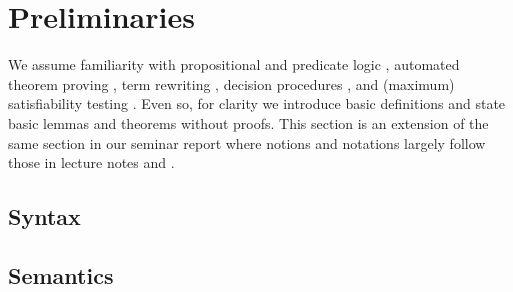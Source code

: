 
\chapter{Preliminaries}



We assume familiarity with propositional and predicate logic \cite{Huth:2004:LCS:975331}, 
automated theorem proving \cite{Fitting:1996:FLA:230183}, 
term rewriting \cite{Baader:1998:TR:280474}, 
decision procedures \cite{Kroening:2008:DPA:1391237}, 
and (maximum) satisfiability testing \cite{Biere:2009:HSV:1550723}.
Even so, for clarity we introduce basic
definitions and state basic lemmas and theorems without proofs.
This section is an extension of the same section in our seminar report \cite{axm:SR2}
where notions and notations largely follow those in lecture notes \cite{AM2015tr} and \cite{GM2013ar}.


\section{Syntax}
















\section{Semantics}

